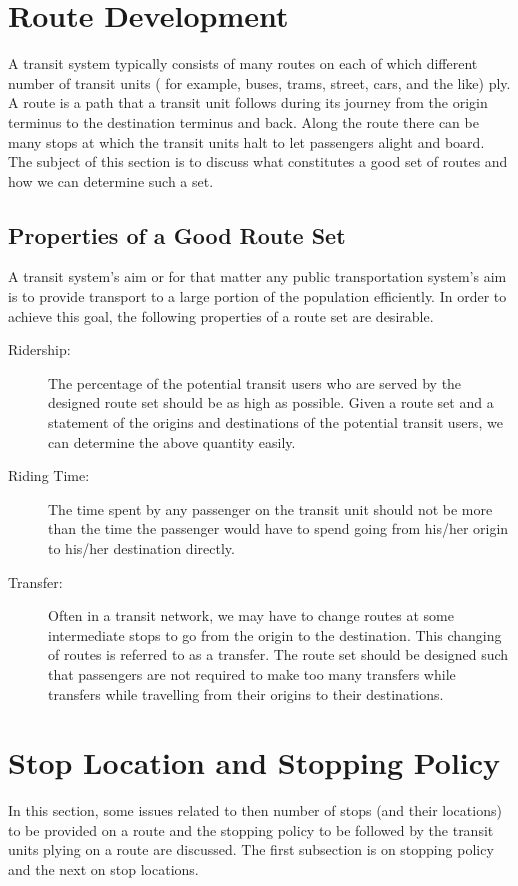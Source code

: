 \section{Route Development}
A transit system typically consists of many routes on each of which different number of transit units ( for example, buses, trams, street, cars, and the like) ply. A route is a path that a transit unit follows during its journey from the origin terminus to the destination terminus and back. Along the route there can be many stops at which the transit units halt to let passengers alight and board. The subject of this section is to discuss what constitutes a good set of routes and how we can determine such a set.
\subsection{Properties of a Good Route Set}
A transit system's aim or for that matter any public transportation system's aim is to provide transport to a large portion of the population efficiently. In order to achieve this goal, the following properties of a route set are desirable.
\begin{description}
	\item [Ridership:] The percentage of the potential transit users who are served by the designed route set should be as high as possible. Given a route set and a statement of the origins and destinations of the potential transit users, we can determine the above quantity easily.
	\item [Riding Time:] The time spent by any passenger on the transit unit should not be more than the time the passenger would have to spend going from his/her origin to his/her destination directly.
	\item [Transfer:] Often in a transit network, we may have to change routes at some intermediate stops to go from the origin to the destination. This changing of routes is referred to as a transfer. The route set should be designed such that passengers are not required to make too many transfers while transfers while travelling from their origins to their destinations.
\end{description}
%
\section{Stop Location and Stopping Policy}
In this section, some issues related to then number of stops (and their locations) to be provided on a route and the stopping policy to be followed by the transit units plying on a route are discussed. The first subsection is on stopping policy and the next on stop locations.
